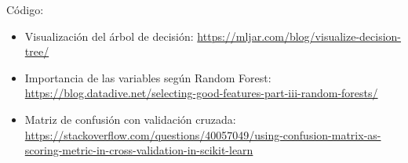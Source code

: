 \documentclass{article}
\begin{document}
Código: 
\begin{itemize}
\item Visualización del árbol de decisión: \href{https://mljar.com/blog/visualize-decision-tree/}{https://mljar.com/blog/visualize-decision-tree/}
\item Importancia de las variables según Random Forest: \href{https://blog.datadive.net/selecting-good-features-part-iii-random-forests/}{https://blog.datadive.net/selecting-good-features-part-iii-random-forests/}
\item Matriz de confusión con validación cruzada: \href{https://stackoverflow.com/questions/40057049/using-confusion-matrix-as-scoring-metric-in-cross-validation-in-scikit-learn}{https://stackoverflow.com/questions/40057049/using-confusion-matrix-as-scoring-metric-in-cross-validation-in-scikit-learn}
\end{itemize}
\end{document}
